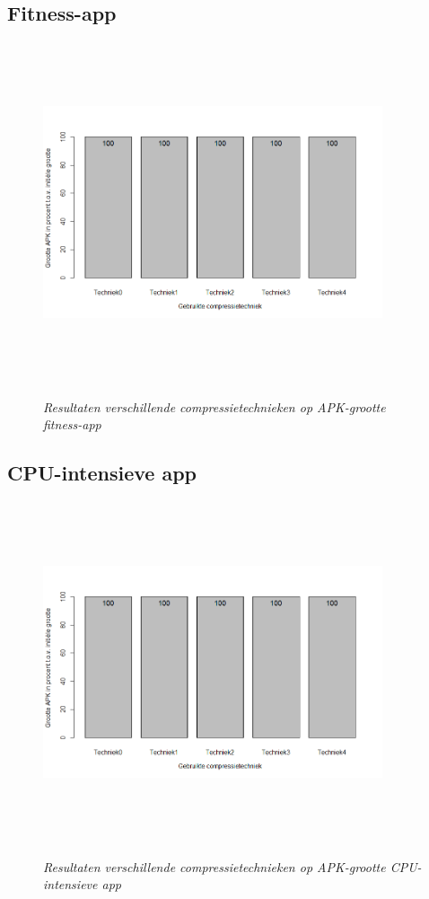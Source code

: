 \subsection{Fitness-app}
\begin{figure}[H]
	\centering
	\caption{\textit{Resultaten verschillende compressietechnieken op APK-grootte fitness-app}}
	\includegraphics[width=10cm, height=10cm, keepaspectratio]{img/Rplot02}\\[.5cm]
	
\end{figure}
\subsection{CPU-intensieve app}
\begin{figure}[H]
	\centering
	\caption{\textit{Resultaten verschillende compressietechnieken op APK-grootte CPU-intensieve app}}
	\includegraphics[width=10cm, height=10cm, keepaspectratio]{img/Rplot02}\\[.5cm]
	
\end{figure}

